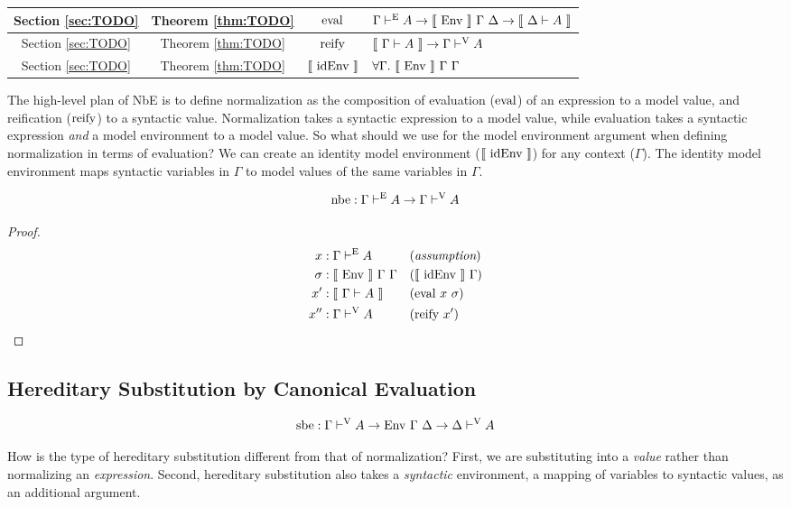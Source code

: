 \documentclass{llncs}
\newcommand{\refthm}[1]{Theorem \ref{thm:#1}}
\newcommand{\refsec}[1]{Section \ref{sec:#1}}
\def\marr{\rightarrow}
\def\reify{\fun{reify}}
\def\eval{\fun{eval}}
\def\sbe{\fun{sbe}}
\def\midenv{\el{\fun{idEnv}}}
\def\byass{(\textit{assumption})}
\newcommand{\by}[1]{(#1)}
\newcommand{\turn}[1]{\vdash^\con{#1}}
\newcommand{\all}[1]{\forall#1.~}
\newcommand{\el}[1]{\llbracket ~ #1 ~ \rrbracket}
\newcommand{\con}[1]{\textmd{#1}}
\newcommand{\fun}[1]{\textmd{#1}}
\newcommand{\typm}[1]{\el{\Gamma \vdash #1}}
\newcommand{\dtypm}[1]{\el{\Delta \vdash #1}}
\newcommand{\type}[1]{\Gamma \turn{E} #1}
\newcommand{\typv}[1]{\Gamma \turn{V} #1}
\newcommand{\dtypv}[1]{\Delta \turn{V} #1}
\def\menv{\el{\fun{Env}}~\Gamma~\Delta}
\def\env{\fun{Env}~\Gamma~\Delta}
\newcommand{\gmenv}[1]{\el{\fun{Env}}~\Gamma~#1}
\newcommand{\cmenv}[2]{\el{\fun{Env}}~#1~#2}
\begin{document}
\hfill \break
\begin{tabularx}{\textwidth}{ |c|c|c|X| }
  \hline
  \refsec{TODO} & \refthm{TODO} & $\eval$ & $\type{A} \marr \menv \marr \dtypm{A}$ \\
  \hline
  \refsec{TODO} & \refthm{TODO} & $\reify$ & $\typm{A} \marr \typv{A}$ \\
  \hline
  \refsec{TODO} & \refthm{TODO} & $\midenv$ & $\all{\Gamma} \gmenv{\Gamma}$ \\
  \hline
\end{tabularx}
\hfill \break

The high-level plan of NbE is to define
normalization as the composition of evaluation ($\eval$) of an expression to a
model value, and reification ($\reify$) to a syntactic value.
Normalization takes a syntactic expression to a model value,
while evaluation takes a syntactic expression \textit{and} a model
environment to a model value. So what should we use for the model
environment argument when defining normalization in terms of
evaluation? We can create an identity model environment ($\midenv$)
for any context ($\Gamma$). The identity model environment maps
syntactic variables in $\Gamma$ to model values of the same variables in $\Gamma$.

\begin{theorem}
\label{thm:mod:nbe}
$$
\fun{nbe} : \type{A} \marr \typv{A}
$$

\begin{proof}
\begin{align*}
x    &: \type{A} && \byass\\
\sigma &: \cmenv{\Gamma}{\Gamma} && \by{\midenv~\Gamma}\\
x'  &: \typm{A} && \by{\eval~x~\sigma}\\
x'' &: \typv{A} && \by{\reify~x'}
\end{align*}
\end{proof}

\end{theorem}

\subsection{Hereditary Substitution by Canonical Evaluation}

$$
\sbe : \typv{A} \marr \env \marr \dtypv{A}
$$

How is the type of hereditary substitution different from that of
normalization? First, we are substituting into a \textit{value} rather
than normalizing an \textit{expression}. Second, hereditary
substitution also takes a \textit{syntactic} environment, a mapping of
variables to syntactic values, as an additional argument.
\end{document}
